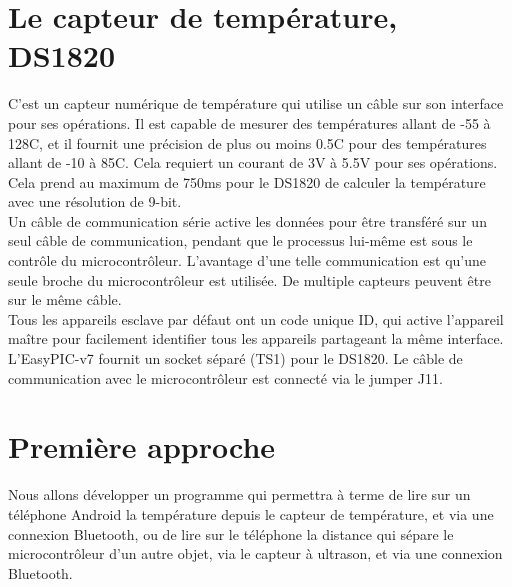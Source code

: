 \documentclass[a4paper, 12pt]{book}
\newcounter{program}[subsection]
\begin{document}
\chapter{Le capteur de température, DS1820}
C’est un capteur numérique de température qui utilise un câble sur son interface pour ses opérations. Il est capable de mesurer des températures allant de -55 à 128C, et il fournit une précision de plus ou moins 0.5C pour des températures allant de -10 à 85C. Cela requiert un courant de 3V à 5.5V pour ses opérations. Cela prend au maximum de 750ms pour le DS1820 de calculer la température avec une résolution de 9-bit.\\
Un câble de communication série active les données pour être transféré sur un seul câble de communication, pendant que le processus lui-même est sous le contrôle du microcontrôleur. L’avantage d’une telle communication est qu’une seule broche du microcontrôleur est utilisée. De multiple capteurs peuvent être sur le même câble.\\
Tous les appareils esclave par défaut ont un code unique ID, qui active l’appareil maître pour facilement identifier tous les appareils partageant la même interface. L’EasyPIC-v7 fournit un socket séparé (TS1) pour le DS1820. Le câble de communication avec le microcontrôleur est connecté via le jumper J11.


\chapter{Première approche}
Nous allons développer un programme qui permettra à terme de lire sur un téléphone Android la température depuis le capteur de température, et via une connexion Bluetooth, 
ou de lire sur le téléphone la distance qui sépare le microcontrôleur d'un autre objet, via le capteur à ultrason, et via une connexion Bluetooth.\\\\\\\\\\\\\\\\\\\\\\\\\\\\\\

\cite{redbook}
\end{document}
